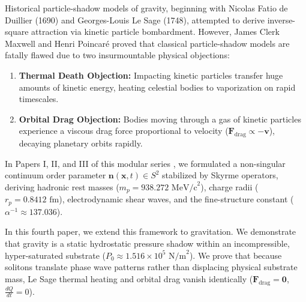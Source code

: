 \documentclass[11pt,a4paper]{article}
\begin{document}
	Historical particle-shadow models of gravity, beginning with Nicolas Fatio de Duillier (1690) and Georges-Louis Le Sage (1748), attempted to derive inverse-square attraction via kinetic particle bombardment. However, James Clerk Maxwell and Henri Poincaré proved that classical particle-shadow models are fatally flawed due to two insurmountable physical objections:
	\begin{enumerate}
		\item \textbf{Thermal Death Objection:} Impacting kinetic particles transfer huge amounts of kinetic energy, heating celestial bodies to vaporization on rapid timescales.
		\item \textbf{Orbital Drag Objection:} Bodies moving through a gas of kinetic particles experience a viscous drag force proportional to velocity ($\mathbf{F}_{\text{drag}} \propto -\mathbf{v}$), decaying planetary orbits rapidly.
	\end{enumerate}
	
	In Papers I, II, and III of this modular series \cite{PaperI, PaperII, PaperIII}, we formulated a non-singular continuum order parameter $\mathbf{n}(\mathbf{x}, t) \in S^2$ stabilized by Skyrme operators, deriving hadronic rest masses ($m_p = 938.272 \text{ MeV/c}^2$), charge radii ($r_p = 0.8412 \text{ fm}$), electrodynamic shear waves, and the fine-structure constant ($\alpha^{-1} \approx 137.036$).
	
	In this fourth paper, we extend this framework to gravitation. We demonstrate that gravity is a static hydrostatic pressure shadow within an incompressible, hyper-saturated substrate ($P_0 \approx 1.516 \times 10^5 \text{ N/m}^2$). We prove that because solitons translate phase wave patterns rather than displacing physical substrate mass, Le Sage thermal heating and orbital drag vanish identically ($\mathbf{F}_{\text{drag}} = \mathbf{0}$, $\frac{dQ}{dt} = 0$).
	
\end{document}
